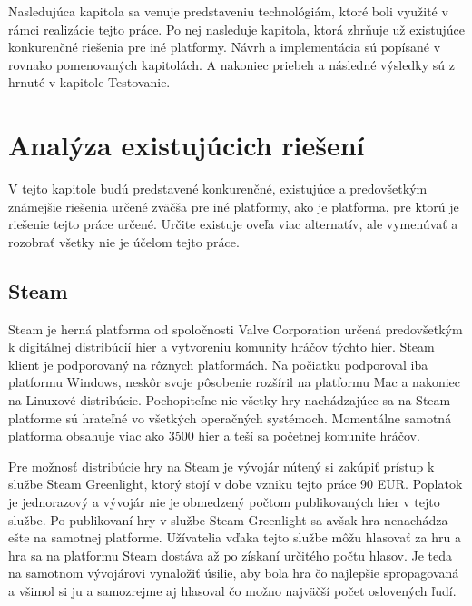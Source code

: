 Nasledujúca kapitola sa venuje predstaveniu technológiám, ktoré boli využité v rámci realizácie tejto práce. Po nej nasleduje kapitola, ktorá zhrňuje už existujúce konkurenčné riešenia pre iné platformy. Návrh a implementácia sú popísané v rovnako pomenovaných kapitolách. A nakoniec priebeh a následné výsledky sú z hrnuté v kapitole Testovanie.

\chapter{Analýza existujúcich riešení}
\label{chap:analyza}
V tejto kapitole budú predstavené konkurenčné, existujúce a predovšetkým známejšie riešenia určené zväčša pre iné platformy, ako je platforma, pre ktorú je riešenie tejto práce určené. Určite existuje oveľa viac alternatív, ale vymenúvať a rozobrať všetky nie je účelom tejto práce.

\section{Steam}
Steam je herná platforma od spoločnosti Valve Corporation určená predovšetkým k digitálnej distribúcií hier a vytvoreniu komunity hráčov týchto hier. Steam klient je podporovaný na rôznych platformách. Na počiatku podporoval iba platformu Windows, neskôr svoje pôsobenie rozšíril na platformu Mac a nakoniec na Linuxové distribúcie. Pochopiteľne nie všetky hry nachádzajúce sa na Steam platforme sú hrateľné vo všetkých operačných systémoch. Momentálne samotná platforma obsahuje viac ako 3500 hier a teší sa početnej komunite hráčov. \cite{steam}

Pre možnosť distribúcie hry na Steam je vývojár nútený si zakúpiť prístup k službe Steam Greenlight, ktorý stojí v dobe vzniku tejto práce 90 EUR. Poplatok je jednorazový a vývojár nie je obmedzený počtom publikovaných hier v tejto službe. Po publikovaní hry v službe Steam Greenlight sa avšak hra nenachádza ešte na samotnej platforme. Užívatelia vďaka tejto službe môžu hlasovať za hru a hra sa na platformu Steam dostáva až po získaní určitého počtu hlasov. Je teda na samotnom vývojárovi vynaložiť úsilie, aby bola hra čo najlepšie spropagovaná a všimol si ju a samozrejme aj hlasoval čo možno najväčší počet oslovených ľudí. \cite{steam-greenlight}

